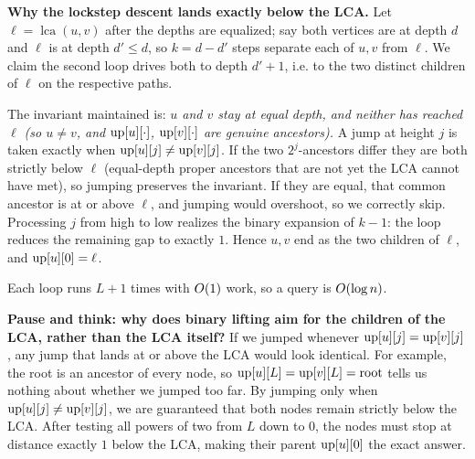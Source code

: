 \begin{whybox}
\textbf{Why the lockstep descent lands exactly below the LCA.} Let
$\ell=\operatorname{lca}(u,v)$ after the depths are equalized; say both vertices are at depth
$d$ and $\ell$ is at depth $d'\le d$, so $k=d-d'$ steps separate each of $u,v$ from $\ell$.
We claim the second loop drives both to depth $d'{+}1$, i.e. to the two distinct children of
$\ell$ on the respective paths.

The invariant maintained is: \emph{$u$ and $v$ stay at equal depth, and neither has reached
$\ell$ (so $u\neq v$, and $\mathrm{up}[u][\cdot]$, $\mathrm{up}[v][\cdot]$ are genuine ancestors).} A jump at
height $j$ is taken exactly when $\mathrm{up}[u][j]\neq\mathrm{up}[v][j]$. If the two $2^j$-ancestors differ
they are both strictly below $\ell$ (equal-depth proper ancestors that are not yet the LCA
cannot have met), so jumping preserves the invariant. If they are equal, that common
ancestor is at or above $\ell$, and jumping would overshoot, so we correctly skip. Processing
$j$ from high to low realizes the binary expansion of $k-1$: the loop reduces the remaining
gap to exactly $1$. Hence $u,v$ end as the two children of $\ell$, and $\mathrm{up}[u][0]=\ell$.
\end{whybox}

Each loop runs $L{+}1$ times with $O(1)$ work, so a query is $O(\log n)$.

\begin{recoverybox}
\textbf{Pause and think: why does binary lifting aim for the children of the LCA, rather than the LCA itself?}
If we jumped whenever $\mathrm{up}[u][j] = \mathrm{up}[v][j]$, any jump that lands at or above the LCA would look identical. For example, the root is an ancestor of every node, so $\mathrm{up}[u][L] = \mathrm{up}[v][L] = \text{root}$ tells us nothing about whether we jumped too far. By jumping only when $\mathrm{up}[u][j] \ne \mathrm{up}[v][j]$, we are guaranteed that both nodes remain strictly below the LCA. After testing all powers of two from $L$ down to $0$, the nodes must stop at distance exactly $1$ below the LCA, making their parent $\mathrm{up}[u][0]$ the exact answer.
\end{recoverybox}

